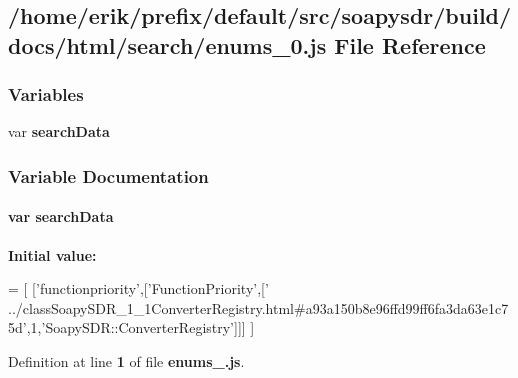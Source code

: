 \subsection{/home/erik/prefix/default/src/soapysdr/build/docs/html/search/enums\+\_\+0.js File Reference}
\label{enums__0_8js}
\subsubsection*{Variables}
\begin{DoxyCompactItemize}
\item 
var {\bf search\+Data}
\end{DoxyCompactItemize}


\subsubsection{Variable Documentation}
\paragraph[{search\+Data}]{\setlength{\rightskip}{0pt plus 5cm}var search\+Data}\label{enums__0_8js_ad01a7523f103d6242ef9b0451861231e}
{\bfseries Initial value\+:}
\begin{DoxyCode}
=
[
  [\textcolor{stringliteral}{'functionpriority'},[\textcolor{stringliteral}{'FunctionPriority'},[\textcolor{stringliteral}{'
      ../classSoapySDR\_1\_1ConverterRegistry.html#a93a150b8e96ffd99ff6fa3da63e1c75d'},1,\textcolor{stringliteral}{'SoapySDR::ConverterRegistry'}]]]
]
\end{DoxyCode}


Definition at line {\bf 1} of file {\bf enums\+\_.\+js}.

